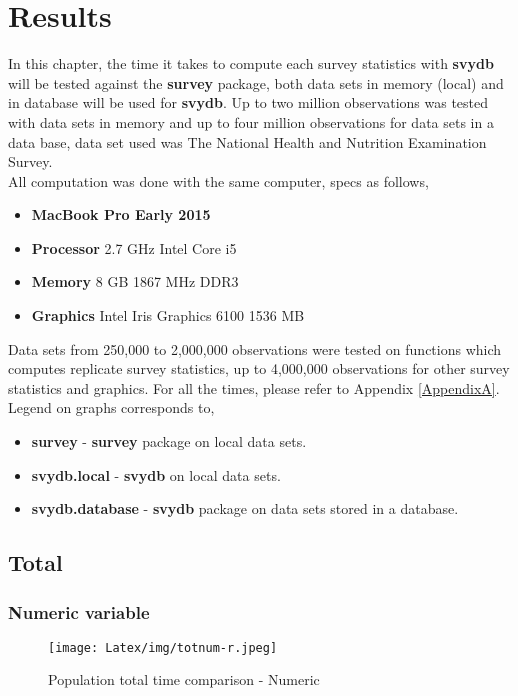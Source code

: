
\chapter{Results} \label{c4} %

In this chapter, the time it takes to compute each survey statistics with {\bf svydb} will be tested against the {\bf survey} package, both data sets in memory (local) and in database will be used for {\bf svydb}. Up to two million observations was tested with data sets in memory and up to four million observations for data sets in a data base, data set used was The National Health and Nutrition Examination Survey.\\

All computation was done with the same computer, specs as follows,
\begin{itemize}
    \item {\bf MacBook Pro Early 2015}
    \item {\bf Processor} 2.7 GHz Intel Core i5 
    \item {\bf Memory} 8 GB 1867 MHz DDR3
    \item {\bf Graphics} Intel Iris Graphics 6100 1536 MB
\end{itemize}

\hfill

Data sets from 250,000 to 2,000,000 observations were tested on functions which computes replicate survey statistics, up to 4,000,000 observations for other survey statistics and graphics. For all the times, please refer to Appendix \ref{AppendixA}.\\

Legend on graphs corresponds to,
\begin{itemize}
    \item {\bf survey} - {\bf survey} package on local data sets.
    \item {\bf svydb.local}  -  {\bf svydb} on local data sets.
    \item {\bf svydb.database} -  {\bf svydb} package on data sets stored in a database.
\end{itemize}




\section{Total}
\subsection{Numeric variable}
\begin{figure}[H]
    \centering
    \texttt{[image: Latex/img/totnum-r.jpeg]}
    \caption{Population total time comparison - Numeric}
    \label{fig:totnum-r}
\end{figure}

